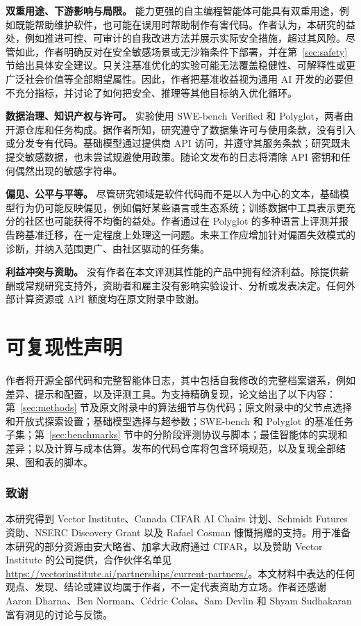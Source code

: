 \documentclass[10pt,twocolumn]{article}
\begin{document}
\textbf{双重用途、下游影响与局限。}
能力更强的自主编程智能体可能具有双重用途，例如既能帮助维护软件，也可能在误用时帮助制作有害代码。作者认为，本研究的益处，例如推进可控、可审计的自我改进方法并展示实际安全措施，超过其风险。尽管如此，作者明确反对在安全敏感场景或无沙箱条件下部署，并在第~\ref{sec:safety} 节给出具体安全建议。只关注基准优化的实验可能无法覆盖稳健性、可解释性或更广泛社会价值等全部期望属性。因此，作者把基准收益视为通用 AI 开发的必要但不充分指标，并讨论了如何把安全、推理等其他目标纳入优化循环。

\textbf{数据治理、知识产权与许可。}
实验使用 SWE-bench Verified 和 Polyglot，两者由开源仓库和任务构成。据作者所知，研究遵守了数据集许可与使用条款，没有引入或分发专有代码。基础模型通过提供商 API 访问，并遵守其服务条款；研究既未提交敏感数据，也未尝试规避使用政策。随论文发布的日志将清除 API 密钥和任何偶然出现的敏感字符串。

\textbf{偏见、公平与平等。}
尽管研究领域是软件代码而不是以人为中心的文本，基础模型行为仍可能反映偏见，例如偏好某些语言或生态系统；训练数据中工具表示更充分的社区也可能获得不均衡的益处。作者通过在 Polyglot 的多种语言上评测并报告跨基准迁移，在一定程度上处理这一问题。未来工作应增加针对偏置失效模式的诊断，并纳入范围更广、由社区驱动的任务集。

\textbf{利益冲突与资助。}
没有作者在本文评测其性能的产品中拥有经济利益。除提供薪酬或常规研究支持外，资助者和雇主没有影响实验设计、分析或发表决定。任何外部计算资源或 API 额度均在原文附录中致谢。

\section*{可复现性声明}

作者将开源全部代码和完整智能体日志，其中包括自我修改的完整档案谱系，例如差异、提示和配置，以及评测工具。为支持精确复现，论文给出了以下内容：第~\ref{sec:methods} 节及原文附录中的算法细节与伪代码；原文附录中的父节点选择和开放式探索设置；基础模型选择与超参数；SWE-bench 和 Polyglot 的基准任务子集；第~\ref{sec:benchmarks} 节中的分阶段评测协议与脚本；最佳智能体的实现和差异；以及计算与成本估算。发布的代码仓库将包含环境规范，以及复现全部结果、图和表的脚本。

\subsubsection*{致谢}
本研究得到 Vector Institute、Canada CIFAR AI Chairs 计划、Schmidt Futures 资助、NSERC Discovery Grant 以及 Rafael Cosman 慷慨捐赠的支持。用于准备本研究的部分资源由安大略省、加拿大政府通过 CIFAR，以及赞助 Vector Institute 的公司提供，合作伙伴名单见 \url{https://vectorinstitute.ai/partnerships/current-partners/}。本文材料中表达的任何观点、发现、结论或建议均属于作者，不一定代表资助方立场。作者还感谢 Aaron Dharna、Ben Norman、C\'edric Colas、Sam Devlin 和 Shyam Sudhakaran 富有洞见的讨论与反馈。



\end{document}
